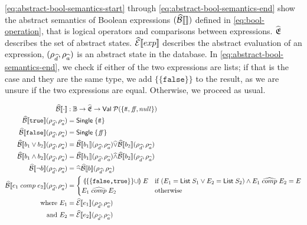 \autoref{eq:abstract-bool-semantics-start} through \ref{eq:abstract-bool-semantics-end} show the abstract semantics of Boolean expressions $(\widehat{\mathcal{B}}\llbracket  \rrbracket)$ defined in \autoref{eq:bool-operation}, that is logical operators and comparisons between expressions.
$\widehat{\mathfrak{E}}$ describes the set of abstract states. $\widehat{\mathcal{E}}\llbracket exp \rrbracket$ describes the abstract evaluation of an expression, $(\rho_{\widehat{d}}, \rho_{\widehat{a}})$ is an abstract state in the database.
In \autoref{eq:abstract-bool-semantics-end}, we check if either of the two expressions are lists; if that is the case and they are the same type, we add $\{\{\texttt{false}\}\}$ to the result, as we are unsure if the two expressions are equal.
Otherwise, we proceed as usual.

\begin{align}
    \absboolsem{\cdot} &: \mathbb{B} \rightarrow \ab{\mathfrak{E}} \rightarrow \mathsf{Val} \; \mathcal{P}(\{\true, \false, null\}) \label{eq:bool-operation} \\
    \absboolsem{\texttt{true}}(\rho_{\ab{d}}, \rho_{\ab{a}}) &= \mathsf{Single} \; \{\true\} \label{eq:abstract-bool-semantics-start} \\
    \absboolsem{\texttt{false}}(\rho_{\ab{d}}, \rho_{\ab{a}}) &= \mathsf{Single} \; \{\false\} \\
    \absboolsem{b_1 \lor b_2}(\rho_{\ab{d}}, \rho_{\ab{a}}) &= \absboolsem{b_1}(\rho_{\ab{d}}, \rho_{\ab{a}}) \ab{\lor} \absboolsem{b_2}(\rho_{\ab{d}}, \rho_{\ab{a}}) \\
    \absboolsem{b_1 \land b_2}(\rho_{\ab{d}}, \rho_{\ab{a}}) &= \absboolsem{b_1}(\rho_{\ab{d}}, \rho_{\ab{a}}) \ab{\land} \absboolsem{b_2}(\rho_{\ab{d}}, \rho_{\ab{a}}) \\
    \absboolsem{\neg b}(\rho_{\ab{d}}, \rho_{\ab{a}}) &= \ab{\neg} \absboolsem{b}(\rho_{\ab{d}}, \rho_{\ab{a}})  \\
    \absboolsem{e_1 \;comp\; e_2}(\rho_{\ab{d}}, \rho_{\ab{a}}) &=  \begin{cases}
        \app{\{\{\texttt{false,true}\}\} \cup} E & \text{if } (E_1 = \mathsf{List} \; S_1 \lor E_2 = \mathsf{List} \; S_2) \land E_1 \;\ab{\comp}\; E_2 = E\\
        E_1 \;\ab{\comp}\; E_2 & \text{otherwise}
    \end{cases}\label{eq:abstract-bool-semantics-end} \\
    \text{where } E_1 &= \absexpsem{e_1}(\rho_{\ab{d}}, \rho_{\ab{a}}) \nonumber \\
    \text{and }  E_2 &= \absexpsem{e_2}(\rho_{\ab{d}}, \rho_{\ab{a}})  \nonumber
\end{align}

